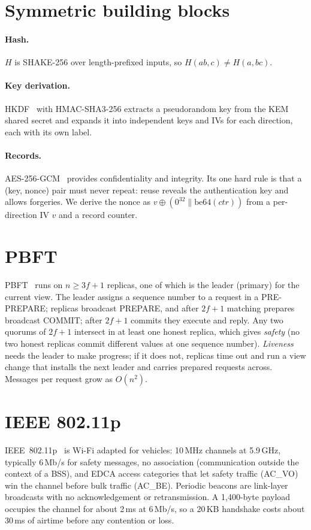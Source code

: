 \section{Symmetric building blocks}

\paragraph{Hash.} $H$ is SHAKE-256 over length-prefixed inputs, so
$H(ab, c) \neq H(a, bc)$.

\paragraph{Key derivation.} HKDF~\cite{hkdf} with HMAC-SHA3-256 extracts a
pseudorandom key from the KEM shared secret and expands it into independent
keys and IVs for each direction, each with its own label.

\paragraph{Records.} AES-256-GCM~\cite{gcm} provides confidentiality and
integrity. Its one hard rule is that a (key, nonce) pair must never repeat:
reuse reveals the authentication key and allows forgeries. We derive the
nonce as $v \oplus (0^{32} \parallel \mathrm{be64}(ctr))$ from a per-direction
IV $v$ and a record counter.

\section{PBFT}

PBFT~\cite{pbft} runs on $n \ge 3f + 1$ replicas, one of which is the leader
(primary) for the current view. The leader assigns a sequence number to a
request in a PRE-PREPARE; replicas broadcast PREPARE, and after $2f+1$
matching prepares broadcast COMMIT; after $2f+1$ commits they execute and
reply. Any two quorums of $2f+1$ intersect in at least one honest replica,
which gives \emph{safety} (no two honest replicas commit different values at
one sequence number). \emph{Liveness} needs the leader to make progress; if it
does not, replicas time out and run a view change that installs the next
leader and carries prepared requests across. Messages per request grow as
$O(n^2)$.

\section{IEEE 802.11p}

IEEE~802.11p~\cite{ieee80211p} is Wi-Fi adapted for vehicles: 10\,MHz
channels at 5.9\,GHz, typically 6\,Mb/s for safety messages, no association
(communication outside the context of a BSS), and EDCA access categories that
let safety traffic (AC\_VO) win the channel before bulk traffic (AC\_BE).
Periodic beacons are link-layer broadcasts with no acknowledgement or
retransmission. A 1,400-byte payload occupies the channel for about 2\,ms at
6\,Mb/s, so a 20\,KB handshake costs about 30\,ms of airtime before any
contention or loss.
